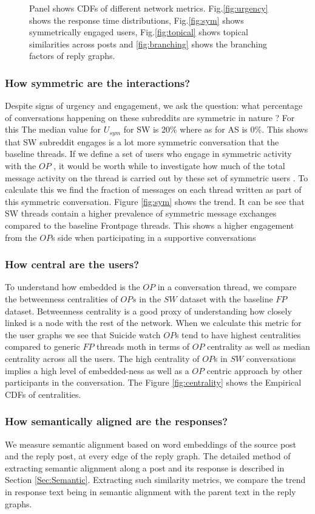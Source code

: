 \begin{figure}[!ht]
    
\caption{Panel shows CDFs of different network metrics. Fig.\ref{fig:urgency} shows the response time distributions, Fig.\ref{fig:sym} shows symmetrically engaged users, Fig.\ref{fig:topical} shows topical similarities across posts and \ref{fig:branching} shows the branching factors of reply graphs. }
\end{figure}

\subsubsection{How symmetric are the interactions?}
Despite signs of urgency and engagement, we ask the question: what percentage of conversations happening on these subreddits are symmetric in nature ? 
For this The median value for $U_{sym}$ for SW is 20\% where as for AS is 0\%. This shows that SW subreddit engages is a lot more symmetric conversation that the baseline threads.
If we define a set of users who engage in symmetric activity with the $OP$ , it would be worth while to investigate how much of the total message activity on the thread is carried out by these set of symmetric users . To calculate this we find the fraction of messages on each thread written as part of this symmetric conversation. Figure \ref{fig:sym} shows the trend. It can be see that SW threads contain a higher prevalence of symmetric message exchanges compared to the baseline Frontpage threads. This shows a higher engagement from the $OP$s side when participating in a supportive conversations

\subsubsection{How central are the users?}
To understand how embedded is the $OP$ in a conversation thread, we compare the betweenness centralities of $OPs$ in the $SW$ dataset with the baseline $FP$ dataset. 
Betweenness centrality is a good proxy of understanding how closely linked is a node with the rest of the network. When we calculate this metric for the user graphs we see that Suicide watch $OP$s tend to have highest centralities compared to generic $FP$ threads moth in terms of $OP$ centrality as well as median centrality across all the users. The high centrality of $OP$s in $SW$ conversations implies a high level of embedded-ness as well as a $OP$ centric approach by other participants in the conversation. The Figure \ref{fig:centrality} shows the Empirical CDFs of centralities. 

\subsubsection{How semantically aligned are the responses?}
We measure semantic alignment based on word embeddings of the source post and the reply post, at every edge of the reply graph. The detailed method of extracting semantic alignment along a post and its response is described in Section \ref{Sec:Semantic}. Extracting such similarity metrics, we compare the trend in response text being in semantic alignment with the parent text in the reply graphs. 


